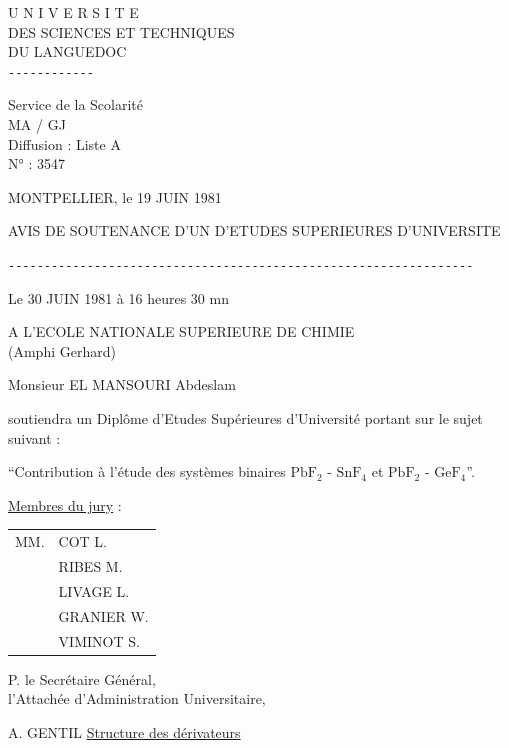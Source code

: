 \begin{center}
U N I V E R S I T E\\
DES SCIENCES ET TECHNIQUES\\
DU LANGUEDOC\\
\texttt{-{}-{}-{}-{}-{}-{}-{}-{}-{}-{}-{}-{}}

Service de la Scolarité\\
MA / GJ\\
Diffusion : Liste A\\
N° : 3547
\end{center}

MONTPELLIER, le 19 JUIN 1981

AVIS DE SOUTENANCE D'UN  D'ETUDES SUPERIEURES D'UNIVERSITE

\texttt{-{}-{}-{}-{}-{}-{}-{}-{}-{}-{}-{}-{}-{}-{}-{}-{}-{}-{}-{}-{}-{}-{}-{}-{}-{}-{}-{}-{}-{}-{}-{}-{}-{}-{}-{}-{}-{}-{}-{}-{}-{}-{}-{}-{}-{}-{}-{}-{}-{}-{}-{}-{}-{}-{}-{}-{}-{}-{}-{}-{}-{}-{}-{}-{}-{}}

Le 30 JUIN 1981 à 16 heures 30 mn

A L'ECOLE NATIONALE SUPERIEURE DE CHIMIE\\
(Amphi Gerhard)

Monsieur EL MANSOURI Abdeslam

soutiendra un Diplôme d'Etudes Supérieures d'Université portant sur le sujet suivant :

``Contribution à l'étude des systèmes binaires $\mathrm{PbF}_2$ - $\mathrm{SnF}_4$ et $\mathrm{PbF}_2$ - $\mathrm{GeF}_4$''.

\uline{Membres du jury} :
\begin{tabular}{ll}
MM.&COT L.\\
&RIBES M.\\
&LIVAGE L.\\
&GRANIER W.\\
&VIMINOT S.
\end{tabular}

P. le Secrétaire Général,\\
l'Attachée d'Administration Universitaire,

A. GENTIL
\uline{Structure des dérivateurs}

